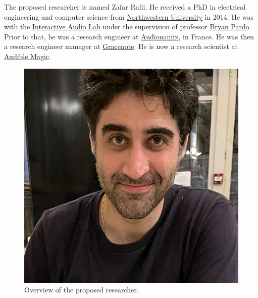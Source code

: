 \documentclass{article}
\begin{document}
\nocite{inbook_pardo_2018}
\nocite{inbook_rafii_2014}

\nocite{report_rafii_2009}

\nocite{misc_mcdermott_oct2012}

\nocite{misc_rafii_jun2014}
\nocite{misc_rafii_jun2011}
\nocite{misc_rafii_dec2007}

\nocite{misc_rafii_mar2021}
\nocite{misc_rafii_apr2018}
\nocite{misc_rafii_july2015}
\nocite{misc_rafii_may2015}
\nocite{misc_rafii_jul2011}

\nocite{misc_rafii_dec2014_4}
\nocite{misc_rafii_dec2014_3}
\nocite{misc_rafii_dec2014_2}
\nocite{misc_rafii_dec2014}

\nocite{online_rafii_2019}
\nocite{online_rafii_2017}


The proposed researcher is named Zafar Rafii. He received a PhD in electrical engineering and computer science from \href{https://www.northwestern.edu/}{Northwestern University} in 2014. He was with the \href{https://interactiveaudiolab.github.io/}{Interactive Audio Lab} under the supervision of professor \href{https://bryan-pardo.github.io/}{Bryan Pardo}. Prior to that, he was a research engineer at \href{https://audionamix.com/}{Audionamix}, in France. He was then a research engineer manager at \href{https://www.gracenote.com/}{Gracenote}. He is now a research scientist at \href{https://www.audiblemagic.com/}{Audible Magic}.

\begin{figure}[!htb]
\centering
\includegraphics[width=0.5\columnwidth]{Images/zafar.jpg}
\caption{Overview of the proposed researcher.}
\label{fig:zafar}
\end{figure}
\end{document}
